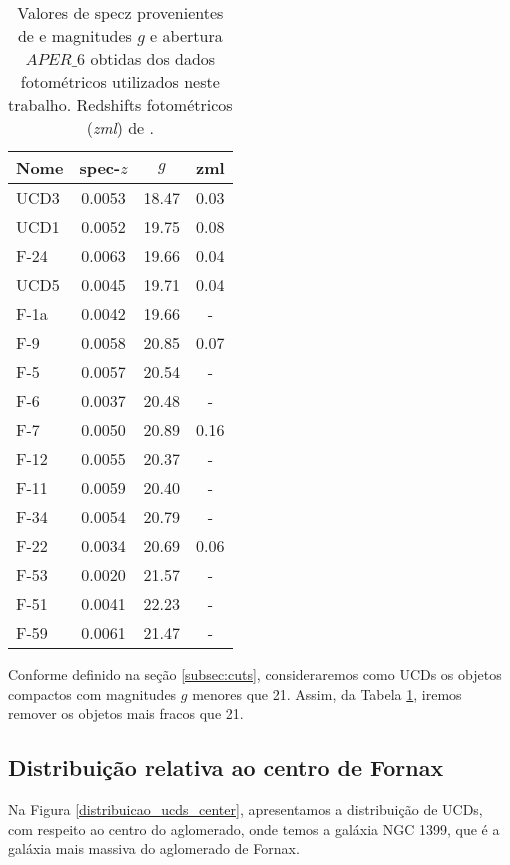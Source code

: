 \begin{table}[!ht]
    \centering
    \caption{Valores de \ac{specz} provenientes de \cite{Lima_2024} e magnitudes $g$ e abertura $APER\_6$ obtidas dos dados fotométricos utilizados neste trabalho. Redshifts fotométricos (\textit{zml}) de \cite{erik_photoz_2024}.}
    \begin{tabular}{lccc}
        \toprule
        Nome & spec-$z$ & $g$ & zml \\
        \midrule
        UCD3 & 0.0053 & 18.47 & 0.03\\
        UCD1 & 0.0052 & 19.75 & 0.08\\
        F-24 & 0.0063 & 19.66 & 0.04\\
        UCD5 & 0.0045 & 19.71 & 0.04\\
        F-1a & 0.0042 & 19.66 & -\\
        F-9  & 0.0058 & 20.85 & 0.07\\
        F-5  & 0.0057 & 20.54 & -\\
        F-6  & 0.0037 & 20.48 & -\\
        F-7  & 0.0050 & 20.89 & 0.16\\
        F-12 & 0.0055 & 20.37 & -\\
        F-11 & 0.0059 & 20.40 & -\\
        F-34 & 0.0054 & 20.79 & -\\
        F-22 & 0.0034 & 20.69 & 0.06\\
        F-53 & 0.0020 & 21.57 & -\\
        F-51 & 0.0041 & 22.23 & -\\
        F-59 & 0.0061 & 21.47 & -\\
        \bottomrule
    \end{tabular}
    \label{tab:ucds_know_z_gmag}
\end{table}

Conforme definido na seção \ref{subsec:cuts}, consideraremos como UCDs os objetos compactos com magnitudes $g$ menores que 21. Assim, da Tabela \ref{tab:ucds_know_z_gmag}, iremos remover os objetos mais fracos que 21.

\subsection{Distribuição relativa ao centro de Fornax}
Na Figura \ref{distribuicao_ucds_center}, apresentamos a distribuição de UCDs, com respeito ao centro do aglomerado, onde temos a galáxia NGC 1399, que é a galáxia mais massiva do aglomerado de Fornax.

